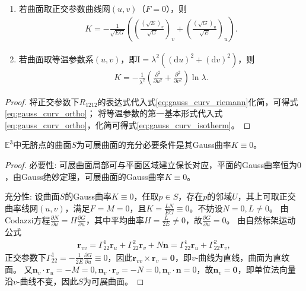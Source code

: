 \documentclass[../../main.tex]{subfiles}%
\begin{document}
\begin{proposition}
\begin{enumerate}[(1)]
\item 若曲面取正交参数曲线网$(u,v)$（$F=0$），则
\begin{align}
K = -\frac{1}{\sqrt{EG}}\left(\left(\frac{(\sqrt{E})_v}{\sqrt{G}}\right)_v+\left(\frac{(\sqrt{G})_u}{\sqrt{E}}\right)_u\right). \label{eq:gauss_curv_ortho}
\end{align}
\item 若曲面取等温参数系$(u,v)$，即$\mathrm{I}=\lambda^2\left((\mathrm{d}u)^2+(\mathrm{d}v)^2\right)$，则
\begin{align}
K = -\frac{1}{\lambda^2}\left(\frac{\partial^2}{\partial u^2}+\frac{\partial^2}{\partial v^2}\right)\ln\lambda. \label{eq:gauss_curv_isotherm}
\end{align}
\end{enumerate}
\end{proposition}

\begin{proof}

将正交参数下$R_{1212}$的表达式代入式\eqref{eq:gauss_curv_riemann}化简，可得式\eqref{eq:gauss_curv_ortho}；
将等温参数的第一基本形式代入式\eqref{eq:gauss_curv_ortho}，化简可得式\eqref{eq:gauss_curv_isotherm}。

\end{proof}

\begin{theorem}
$\mathbb{E}^3$中无脐点的曲面$S$为可展曲面的充分必要条件是其Gauss曲率$K\equiv0$。
\end{theorem}
\begin{proof}

{\heiti 必要性}: 可展曲面局部可与平面区域建立保长对应，平面的Gauss曲率恒为$0$，由Gauss绝妙定理，可展曲面的Gauss曲率$K\equiv0$。

{\heiti 充分性}: 设曲面$S$的Gauss曲率$K\equiv0$，任取$p\in S$，存在$p$的邻域$U$，其上可取正交曲率线网$(u,v)$，满足$F=M=0$，且$K=\frac{LN}{EG}\equiv0$。不妨设$N=0,L\neq0$。
由Codazzi方程$\frac{\partial N}{\partial u}=H\frac{\partial G}{\partial u}$，其中平均曲率$H=\frac{L}{2E}\neq0$，故$\frac{\partial G}{\partial u}=0$。
由自然标架运动公式
\begin{align*}
\boldsymbol{r}_{vv}=\Gamma^1_{22}\boldsymbol{r}_u+\Gamma^2_{22}\boldsymbol{r}_v+N\boldsymbol{n}=\Gamma^1_{22}\boldsymbol{r}_u+\Gamma^2_{22}\boldsymbol{r}_v,
\end{align*}
正交参数下$\Gamma^1_{22}=-\frac{1}{2E}\frac{\partial G}{\partial u}\equiv0$，因此$\boldsymbol{r}_{vv}\times\boldsymbol{r}_v=\boldsymbol{0}$，即$v$-曲线为直线，曲面为直纹面。
又$\boldsymbol{n}_v\cdot\boldsymbol{r}_u=-M=0,\boldsymbol{n}_v\cdot\boldsymbol{r}_v=-N=0,\boldsymbol{n}_v\cdot\boldsymbol{n}=0$，故$\boldsymbol{n}_v=\boldsymbol{0}$，即单位法向量沿$v$-曲线不变，因此$S$为可展曲面。

\end{proof}
\end{document}
